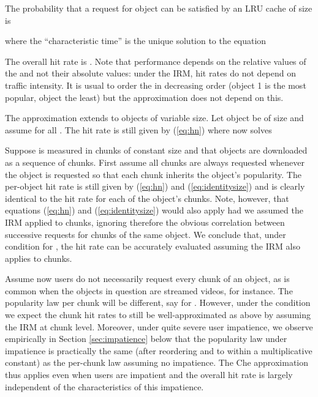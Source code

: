 \documentclass [11pt]{article}
\begin{document}
The probability  that a request for object  can be satisfied by an LRU cache of size  is

where the ``characteristic time''  is the unique solution to the equation 

The overall hit rate is . Note that performance depends on the relative values of the  and not their absolute values: under the IRM, hit rates do not depend on traffic intensity. It is usual to order the  in decreasing order (object 1 is the most popular, object  the least) but the approximation does not depend on this.  

The approximation extends to objects of variable size. Let object  be of size  and assume  for all . The hit rate is still given by (\ref{eq:hn}) where  now solves 



Suppose  is measured in chunks of constant size and that objects are downloaded as a sequence of chunks. First assume all chunks are always requested whenever the object is requested so that each chunk inherits the object's popularity. The per-object hit rate is still given by (\ref{eq:hn}) and (\ref{eq:identitysize}) and is clearly identical to the hit rate for each of the object's chunks. Note, however, that equations (\ref{eq:hn}) and (\ref{eq:identitysize}) would also apply had we assumed the IRM applied to chunks, ignoring therefore the obvious correlation between successive requests for chunks of the same object. We conclude that, under condition  for , the hit rate can be accurately evaluated assuming the IRM also applies to chunks.

Assume now users do not necessarily request every chunk of an object, as is common when the objects in question are streamed videos, for instance. The popularity law per chunk will be different,  say for . However, under the condition   we expect the chunk hit rates to still be well-approximated as above by assuming the IRM at chunk level. Moreover, under quite severe user impatience, we observe empirically in Section \ref{sec:impatience} below that the popularity law under impatience is practically the same (after reordering and to within a multiplicative constant) as the per-chunk law assuming no impatience. The Che approximation thus applies even when users are impatient and the overall hit rate  is largely independent of the characteristics of this impatience.



 
\end{document}
